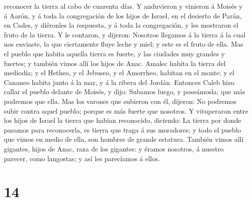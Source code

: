 reconocer la tierra al cabo de cuarenta días.  Y
anduvieron y vinieron á Moisés y á Aarón, y á toda la congregación de
los hijos de Israel, en el desierto de Parán, en Cades, y diéronles la
respuesta, y á toda la congregación, y les mostraron el fruto de la
tierra.  Y le contaron, y dijeron: Nosotros llegamos á la
tierra á la cual nos enviaste, la que ciertamente fluye leche y miel; y
este es el fruto de ella.  Mas el pueblo que habita
aquella tierra es fuerte, y las ciudades muy grandes y fuertes; y
también vimos allí los hijos de Anac.  Amalec habita la
tierra del mediodía; y el Hetheo, y el Jebuseo, y el Amorrheo, habitan
en el monte; y el Cananeo habita junto á la mar, y á la ribera del
Jordán.  Entonces Caleb hizo callar el pueblo delante de
Moisés, y dijo: Subamos luego, y poseámosla; que más podremos que ella.
 Mas los varones que subieron con él, dijeron: No
podremos subir contra aquel pueblo; porque es más fuerte que nosotros.
 Y vituperaron entre los hijos de Israel la tierra que
habían reconocido, diciendo: La tierra por donde pasamos para
reconocerla, es tierra que traga á sus moradores; y todo el pueblo que
vimos en medio de ella, son hombres de grande estatura. También vimos
allí gigantes, hijos de Anac, raza de los gigantes: y éramos nosotros, á
nuestro parecer, como langostas; y así les parecíamos á ellos.

\hypertarget{section-13}{%
\section{14}\label{section-13}}

